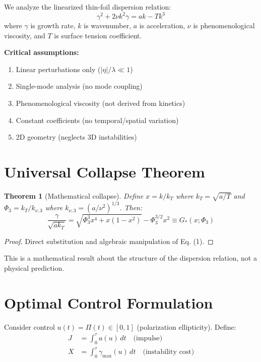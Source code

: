 \documentclass[aps,pre,twocolumn,showpacs,superscriptaddress]{revtex4-2}
\newtheorem{theorem}{Theorem}
\begin{document}
We analyze the linearized thin-foil dispersion relation:
\begin{equation}
\gamma^2 + 2\nu k^2\gamma = ak - Tk^3
\end{equation}
where $\gamma$ is growth rate, $k$ is wavenumber, $a$ is acceleration, $\nu$ is phenomenological viscosity, and $T$ is surface tension coefficient.

\textbf{Critical assumptions:}
\begin{enumerate}
\item Linear perturbations only ($|\eta|/\lambda \ll 1$)
\item Single-mode analysis (no mode coupling)
\item Phenomenological viscosity (not derived from kinetics)
\item Constant coefficients (no temporal/spatial variation)
\item 2D geometry (neglects 3D instabilities)
\end{enumerate}

\section{Universal Collapse Theorem}

\begin{theorem}[Mathematical collapse]
Define $x = k/k_T$ where $k_T = \sqrt{a/T}$ and $\Phi_3 = k_T/k_{\nu,3}$ where $k_{\nu,3} = (a/\nu^2)^{1/3}$. Then:
\begin{equation}
\frac{\gamma}{\sqrt{ak_T}} = \sqrt{\Phi_3^3 x^4 + x(1-x^2)} - \Phi_3^{3/2} x^2 \equiv G_*(x;\Phi_3)
\end{equation}
\end{theorem}

\begin{proof}
Direct substitution and algebraic manipulation of Eq. (1).
\end{proof}

This is a mathematical result about the structure of the dispersion relation, not a physical prediction.

\section{Optimal Control Formulation}

Consider control $u(t) = \Pi(t) \in [0,1]$ (polarization ellipticity). Define:
\begin{align}
J &= \int_0^\tau a(u)\,dt \quad \text{(impulse)}\\
X &= \int_0^\tau \gamma_{\max}(u)\,dt \quad \text{(instability cost)}
\end{align}
\end{document}
